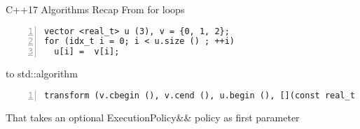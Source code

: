 \documentclass[10pt,aspectratio=169]{beamer}
\begin{document}
\begin{frame}[fragile]{C++17 Algorithms Recap}
From for loops
\begin{lstlisting}[frame=single, style=cpp, firstnumber=1, numbers=left, numberstyle=\tiny,showtabs=false,xleftmargin=.05\linewidth,xrightmargin=.025\linewidth]
vector <real_t> u (3), v = {0, 1, 2};
for (idx_t i = 0; i < u.size () ; ++i)
  u[i] =  v[i];
\end{lstlisting}
to std::algorithm
\begin{lstlisting}[frame=single, style=cpp, firstnumber=1, numbers=left, numberstyle=\tiny,showtabs=false,xleftmargin=.05\linewidth,xrightmargin=.025\linewidth]
transform (v.cbegin (), v.cend (), u.begin (), [](const real_t & vi){return vi;});
\end{lstlisting}
That takes an optional {\ttfamily ExecutionPolicy\&\& policy} as first parameter
\end{frame}
\end{document}
